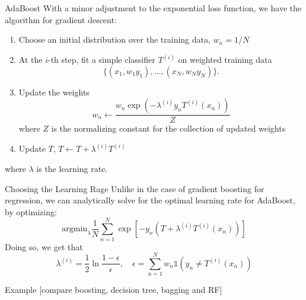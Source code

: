 \documentclass[12pt,t]{beamer}
\begin{document}
\begin{frame}{AdaBoost}
\vskip-0.4cm
\footnotesize
With a minor adjustment to the exponential loss function, we have the algorithm for gradient descent:
\begin{enumerate}
\item Choose an initial distribution over the training data, $w_n = 1/N$
\item At the $i$-th step, fit a simple classifier $T^{(i)}$ on weighted training data
\[
\{(x_1, w_1y_1), \ldots,  (x_N, w_Ny_N)\}.
\]
\item Update the weights
\[
w_n \leftarrow \frac{w_n \exp(-\lambda^{(i)} y_n T^{(i)}(x_n))}{Z}
\]
where $Z$ is the normalizing constant for the collection of updated weights
\item Update $T$, $T \leftarrow T + \lambda^{(i)}T^{(i)}$
\end{enumerate} 
where $\lambda$ is the learning rate.
\end{frame}

\begin{frame}{Choosing the Learning Rage}
Unlike in the case of gradient boosting for regression, we can analytically solve for the optimal learning rate for AdaBoost, by optimizing:
\[
\mathrm{argmin}_\lambda \frac{1}{N} \sum_{n=1}^N \exp\left[-y_n (T + \lambda^{(i)} T^{(i)} (x_n) )\right]
\]
Doing so, we get that 
\[
\lambda^{(i)}  = \frac{1}{2} \ln \frac{1 - \epsilon}{\epsilon}, \quad \epsilon = \sum_{n=1}^N w_n \mathbb{1}(y_n \neq T^{(i)} (x_n))
\]
\vskip0.2cm

\end{frame}


\begin{frame}{Example}
[compare boosting, decision tree, bagging and RF]
\end{frame}
\end{document}
